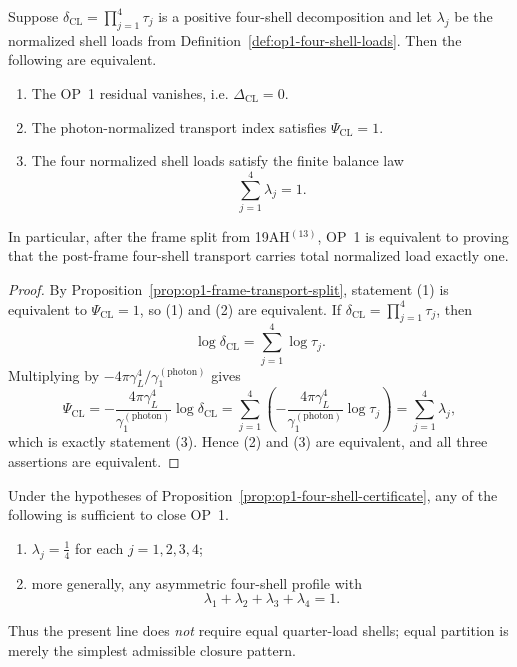 \begin{proposition}
\label{prop:op1-four-shell-certificate}
Suppose \(\delta_{\mathrm{CL}}=\prod_{j=1}^4 \tau_j\) is a positive four-shell decomposition and let \(\lambda_j\) be the normalized shell loads from Definition~\ref{def:op1-four-shell-loads}. Then the following are equivalent.
\begin{enumerate}[leftmargin=2em]
 \item The OP~1 residual vanishes, i.e. \(\Delta_{\mathrm{CL}}=0\).
 \item The photon-normalized transport index satisfies \(\Psi_{\mathrm{CL}}=1\).
 \item The four normalized shell loads satisfy the finite balance law
 \[
 \sum_{j=1}^4 \lambda_j = 1.
 \]
\end{enumerate}
In particular, after the frame split from 19AH$^{(13)}$, OP~1 is equivalent to proving that the post-frame four-shell transport carries total normalized load exactly one.
\end{proposition}

\begin{proof}
By Proposition~\ref{prop:op1-frame-transport-split}, statement (1) is equivalent to \(\Psi_{\mathrm{CL}}=1\), so (1) and (2) are equivalent. If \(\delta_{\mathrm{CL}}=\prod_{j=1}^4 \tau_j\), then
\[
 \log \delta_{\mathrm{CL}} = \sum_{j=1}^4 \log \tau_j.
\]
Multiplying by \(-4\pi\gamma_L^4/\gamma_1^{(\mathrm{photon})}\) gives
\[
 \Psi_{\mathrm{CL}}
 = -\frac{4\pi\gamma_L^4}{\gamma_1^{(\mathrm{photon})}}\log \delta_{\mathrm{CL}}
 = \sum_{j=1}^4 \left(-\frac{4\pi\gamma_L^4}{\gamma_1^{(\mathrm{photon})}}\log \tau_j\right)
 = \sum_{j=1}^4 \lambda_j,
\]
which is exactly statement (3). Hence (2) and (3) are equivalent, and all three assertions are equivalent.
\end{proof}

\begin{corollary}
\label{cor:op1-quarter-shells}
Under the hypotheses of Proposition~\ref{prop:op1-four-shell-certificate}, any of the following is sufficient to close OP~1.
\begin{enumerate}[leftmargin=2em]
 \item \(\lambda_j=\tfrac14\) for each \(j=1,2,3,4\);
 \item more generally, any asymmetric four-shell profile with
 \[
 \lambda_1+\lambda_2+\lambda_3+\lambda_4 = 1.
 \]
\end{enumerate}
Thus the present line does \emph{not} require equal quarter-load shells; equal partition is merely the simplest admissible closure pattern.
\end{corollary}



